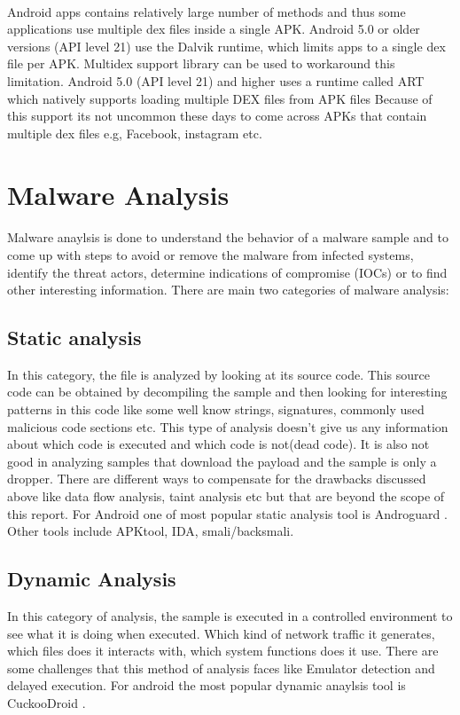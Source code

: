 \documentclass[../main.tex]{subfile}
\begin{document}
				\paragraph{} Android apps contains relatively large number of methods and thus some applications use multiple dex files inside a single APK. Android 5.0 or older versions (API level 21) use the Dalvik runtime, which limits apps to a single dex file per APK. Multidex support library can be used to workaround this limitation. Android 5.0 (API level 21) and higher uses a runtime called ART which natively supports loading multiple DEX files from APK files Because of this support its not uncommon these days to come across APKs that contain multiple dex files e.g, Facebook, instagram etc. \cite{multidex}
		\section{Malware Analysis}\label{sec:malware_analysis}
		\paragraph{} Malware anaylsis is done to understand the behavior of a malware sample and to come up with steps to avoid or remove the malware from infected systems, identify the threat actors, determine indications of compromise (IOCs) or to find other interesting information. There are main two categories of malware analysis:
		\subsection[Static Analysis]{Static analysis} In this category, the file is analyzed by looking at its source code. This source code can be obtained by decompiling the sample and then looking for interesting patterns in this code like some well know strings, signatures, commonly used malicious code sections etc. This type of analysis doesn't give us any information about which code is executed and which code is not(dead code). It is also not good in analyzing samples that download the payload and the sample is only a dropper. There are different ways to compensate for the drawbacks discussed above like data flow analysis, taint analysis etc but that are beyond the scope of this report. For Android one of most popular static analysis tool is Androguard \cite{desnos2017androguard}. Other tools include APKtool, IDA, smali/backsmali.
		\subsection[Dynamic Analysis]{Dynamic Analysis} In this category of analysis, the sample is executed in a controlled environment to see what it is doing when executed. Which kind of network traffic it generates, which files does it interacts with, which system functions does it use. There are some challenges that this method of analysis faces like Emulator detection and delayed execution. For android the most popular dynamic anaylsis tool is CuckooDroid \cite{cuckoodroid_github}.
		
\end{document}
